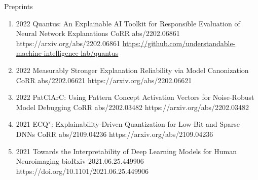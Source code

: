 \documentclass[10pt,a4paper]{article} %
\begin{document}
\headedsection %
{Preprints}{}
{
    \begin{enumerate}

        \item[] 
                            {2022}
                            {Quantus: An Explainable AI Toolkit for Responsible Evaluation of Neural Network Explanations}
                            {CoRR abs/2202.06861}
                            {https://arxiv.org/abs/2202.06861}
                            {\href{https://github.com/understandable-machine-intelligence-lab/quantus}{https://github.com/understandable-machine-intelligence-lab/quantus}}

        \item[] 
                            {2022}
                            {Measurably Stronger Explanation Reliability via Model Canonization}
                            {CoRR abs/2202.06621}
                            {https://arxiv.org/abs/2202.06621}

        \item[] 
                            {2022}
                            {PatClArC: Using Pattern Concept Activation Vectors for Noise-Robust Model Debugging}
                            {CoRR abs/2202.03482}
                            {https://arxiv.org/abs/2202.03482}

        \item[] 
                            {2021}
                            {ECQ$^{\textrm{x}}$: Explainability-Driven Quantization for Low-Bit and Sparse DNNs}
                            {CoRR abs/2109.04236}
                            {https://arxiv.org/abs/2109.04236}

        \item[] 
                            {2021}
                            {Towards the Interpretability of Deep Learning Models for Human Neuroimaging}
                            {bioRxiv 2021.06.25.449906}
                            {https://doi.org/10.1101/2021.06.25.449906}


\end{enumerate}}
\end{document}
